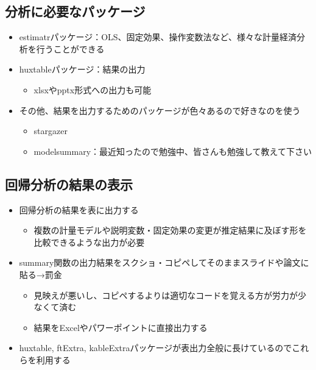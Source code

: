 \documentclass[
]{ltjsarticle}
\providecommand{\tightlist}{%
  \setlength{\itemsep}{0pt}\setlength{\parskip}{0pt}}
\begin{document}
\hypertarget{ux5206ux6790ux306bux5fc5ux8981ux306aux30d1ux30c3ux30b1ux30fcux30b8}{%
\subsection{分析に必要なパッケージ}\label{ux5206ux6790ux306bux5fc5ux8981ux306aux30d1ux30c3ux30b1ux30fcux30b8}}

\begin{itemize}
\tightlist
\item
  estimatrパッケージ：OLS、固定効果、操作変数法など、様々な計量経済分析を行うことができる
\item
  huxtableパッケージ：結果の出力

  \begin{itemize}
  \tightlist
  \item
    xlsxやpptx形式への出力も可能
  \end{itemize}
\item
  その他、結果を出力するためのパッケージが色々あるので好きなのを使う

  \begin{itemize}
  \tightlist
  \item
    stargazer
  \item
    modelsummary：最近知ったので勉強中、皆さんも勉強して教えて下さい
  \end{itemize}
\end{itemize}

\hypertarget{ux56deux5e30ux5206ux6790ux306eux7d50ux679cux306eux8868ux793a}{%
\subsection{回帰分析の結果の表示}\label{ux56deux5e30ux5206ux6790ux306eux7d50ux679cux306eux8868ux793a}}

\begin{itemize}
\tightlist
\item
  回帰分析の結果を表に出力する

  \begin{itemize}
  \tightlist
  \item
    複数の計量モデルや説明変数・固定効果の変更が推定結果に及ぼす形を比較できるような出力が必要
  \end{itemize}
\item
  summary関数の出力結果をスクショ・コピペしてそのままスライドや論文に貼る→罰金

  \begin{itemize}
  \tightlist
  \item
    見映えが悪いし、コピペするよりは適切なコードを覚える方が労力が少なくて済む
  \item
    結果をExcelやパワーポイントに直接出力する
  \end{itemize}
\item
  huxtable, ftExtra,
  kableExtraパッケージが表出力全般に長けているのでこれらを利用する
\end{itemize}
\end{document}
